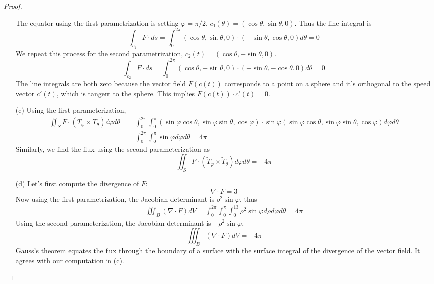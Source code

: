 \documentclass[openany]{book}
\begin{document}
\begin{proof}
\begin{enumerate}
        The equator using the first parametrization is setting $\varphi=\pi/2$, $c_1(\theta)=(\cos\theta, \sin\theta, 0)$. Thus the line integral is 
        \begin{equation*}
            \int_{c_1}F\cdot ds=\int_0^{2\pi}(\cos\theta,\sin\theta,0)\cdot(-\sin\theta,\cos\theta, 0)d\theta=0
        \end{equation*}
        We repeat this process for the second parametrization, $c_2(t)=(\cos\theta,-\sin\theta, 0)$.
        \begin{equation*}
            \int_{c_2}F\cdot ds=\int_0^{2\pi}(\cos\theta,-\sin\theta, 0)\cdot(-\sin\theta, -\cos\theta, 0)d\theta=0
        \end{equation*}
        The line integrals are both zero because the vector field $F(c(t))$ corresponds to a point on a sphere and it's orthogonal to the speed vector $c'(t)$, which is tangent to the sphere. This implies $F(c(t))\cdot c'(t)=0$.
        \item[(c)] Using the first parameterization, 
        \begin{align*}
            \iint_S F\cdot(T_\varphi\times T_\theta)d\varphi d\theta&=\int_0^{2\pi}\int_0^\pi (\sin\varphi\cos\theta,\sin\varphi\sin\theta,\cos\varphi)\cdot \sin\varphi (\sin\varphi\cos\theta,\sin\varphi\sin\theta,\cos\varphi)d\varphi d\theta\\
            &=\int_0^{2\pi}\int_0^\pi \sin\varphi d\varphi d\theta=4\pi
        \end{align*}
        Similarly, we find the flux using the second parameterization as 
        \begin{equation*}
            \iint_S F\cdot(\tilde{T}_\varphi\times \tilde{T}_\theta)d\varphi d\theta=-4\pi
        \end{equation*}
        \item[(d)] Let's first compute the divergence of $F$: 
        \begin{equation*}
            \nabla\cdot F=3
        \end{equation*}
        Now using the first parametrization, the Jacobian determinant is $\rho^2\sin\varphi$, thus 
        \begin{align*}
            \iiint_B(\nabla\cdot F)dV=\int_0^{2\pi}\int_0^\pi\int_0^13\rho^2\sin\varphi d\rho d\varphi d\theta=4\pi
        \end{align*}
        Using the second parameterization, the Jacobian determinant is $-\rho^2\sin\varphi$,
        \begin{equation*}
            \iiint_B(\nabla\cdot F)dV=-4\pi
        \end{equation*}
        Gauss's theorem equates the flux through the boundary of a surface with the surface integral of the divergence of the vector field. It agrees with our computation in (c).
    \end{enumerate}
\end{proof}
\end{document}
